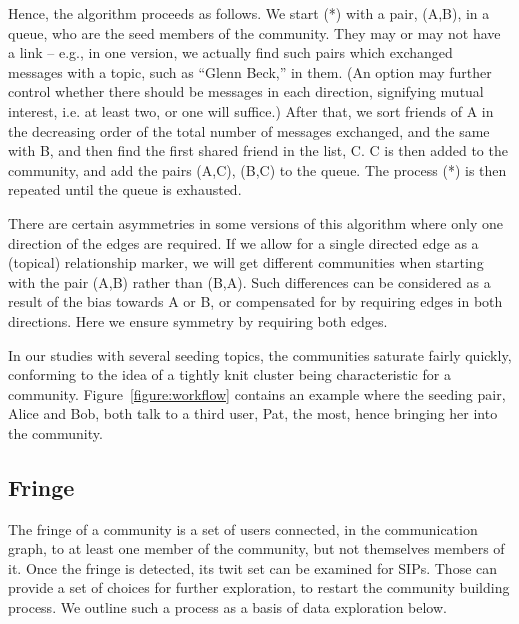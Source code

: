 Hence, the algorithm proceeds as follows.  We start (*) with a pair, (A,B), in a queue, who are the seed members of the community.  They may or may not have a link -- e.g., in one version, we actually find such pairs which exchanged messages with a topic, such as ``Glenn Beck,'' in them.  (An option may further control whether there should be messages in each direction, signifying mutual interest, i.e. at least two, or one will suffice.)  After that, we sort friends of A in the decreasing order of the total number of messages exchanged, and the same with B, and then find the first shared friend in the list, C.  C is then added to the community, and add the pairs (A,C), (B,C) to the queue.  The process (*) is then repeated until the queue is exhausted.

There are certain asymmetries in some versions of this algorithm where only one direction of the edges are required.  If we allow for a single directed edge as a (topical) relationship marker, we will get different communities when starting with the pair (A,B) rather than (B,A).  Such differences can be considered as a result of the bias towards A or B, or compensated for by requiring edges in both directions.  Here we ensure symmetry by requiring both edges.

In our studies with several seeding topics, the communities saturate fairly quickly, conforming to the idea of a tightly knit cluster \cite{DBLP:conf/waw/MishraSST07} being characteristic for a community.  Figure~\ref{figure:workflow} contains an example where the seeding pair, Alice and Bob, both talk to a third user, Pat, the most, hence bringing her into the community.

\subsection{Fringe}

The fringe of a community is a set of users connected, in the communication graph, to at least one member of the community, but not themselves members of it.  Once the fringe is detected, its twit set can be examined for SIPs.  Those can provide a set of choices for further exploration, to restart the community building process.  We outline such a process as a basis of data exploration below.